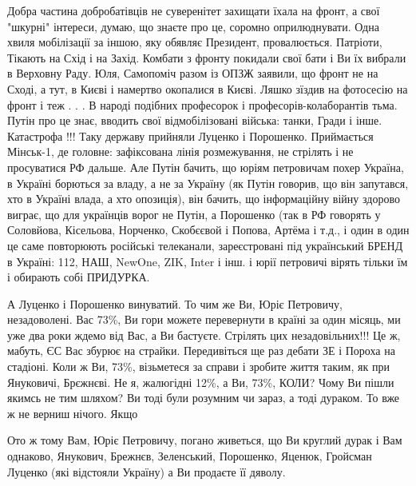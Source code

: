 \begin{itemize}
\begin{itemize}
Добра частина добробатівців не суверенітет захищати їхала на фронт, а свої
"шкурні" інтереси, думаю, що знаєте про це, соромно оприлюднувати. Одна хвиля
мобілізації за іншою, яку обявляє Президент, провалюється. Патріоти, Тікають на
Схід і на Захід. Комбати з фронту покидали свої бати і Ви їх вибрали в Верховну
Раду. Юля, Самопоміч разом із ОПЗЖ заявили, що фронт не на Сході, а тут, в
Києві і намертво окопалися в Києві. Ляшко зїздив на фотосесію на фронт і теж .
. . В народі подібних професорок і професорів-колаборантів тьма. Путін про це
знає, вводить свої відмобілізовані війська: танки, Гради і інше. Катастрофа !!!
Таку державу прийняли Луценко і Порошенко. Приймається Мінськ-1, де головне:
зафіксована лінія розмежування, не стрілять і не просуватися РФ дальше. Але
Путін бачить, що юріям петровичам похер Україна, в Україні борються за владу, а
не за Україну (як Путін говорив, що він запутався, хто в Україні влада, а хто
опозиція), він бачить, що інформаційну війну здорово виграє, що для українців
ворог не Путін, а Порошенко (так в РФ говорять у Соловйова, Кісельова,
Норченко, Скобєєвой і Попова, Артёма і т.д., і один в один це саме повторюють
російські телеканали, зареєстровані під український БРЕНД в Україні: 112, НАШ,
NewOne, ZIK, Inter і інш. і юрії петровичі вірять тільки їм і обирають собі
ПРИДУРКА. 

А Луценко і Порошенко винуватий. То чим же Ви, Юріє Петровичу, незадоволені.
Вас 73\%, Ви гори можете перевернути в країні за один місяць, ми уже два роки
ждемо від Вас, а Ви бастуєте. Стрілять цих незадовільних!!! Це ж, мабуть, ЄС
Вас збурює на страйки. Передивіться ще раз дебати ЗЕ і Пороха на стадіоні. Коли
ж Ви, 73\%, візьметеся за справи і зробите життя таким, як при Януковичі,
Брєжнєві. Не я, жалюгідні 12\%, а Ви, 73\%, КОЛИ? Чому Ви пішли якимсь не тим
шляхом? Ви тоді були розумним чи зараз, а тоді дураком. То вже ж не верниш
нічого. Якщо



Ото ж тому Вам, Юріє Петровичу, погано живеться, що Ви круглий дурак і Вам
однаково, Янукович, Брежнєв, Зеленський, Порошенко, Яценюк, Гройсман Луценко
(які відстояли Україну) а Ви продаєте її дяволу.

\end{itemize}




\end{itemize}
